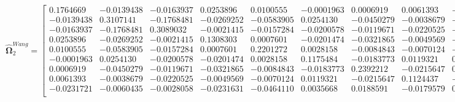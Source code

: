 \documentclass{article}\usepackage[]{graphicx}\usepackage[]{xcolor}
\def\bs{\boldsymbol}
\begin{document}
 \[
 \widehat{\bs{\Omega}}_{2}^{Wang} = 
 
  \begin{bmatrix}
 
 
 
 0.1764669 & -0.0139438 & -0.0163937 & 0.0253896 & 0.0100555 & -0.0001963 & 0.0006919 & 0.0061393 & -0.0231721\\
 
 -0.0139438 & 0.3107141 & -0.1768481 & -0.0269252 & -0.0583905 & 0.0254130 & -0.0450279 & -0.0038679 & -0.0060435\\
 
 -0.0163937 & -0.1768481 & 0.3089032 & -0.0021415 & -0.0157284 & -0.0200578 & -0.0119671 & -0.0220525 & -0.0028058\\
 
 0.0253896 & -0.0269252 & -0.0021415 & 0.1308303 & 0.0007601 & -0.0201474 & -0.0321865 & -0.0049569 & -0.0231631\\
 
 0.0100555 & -0.0583905 & -0.0157284 & 0.0007601 & 0.2201272 & 0.0028158 & -0.0084843 & -0.0070124 & -0.0464110\\
 
 -0.0001963 & 0.0254130 & -0.0200578 & -0.0201474 & 0.0028158 & 0.1175484 & -0.0183773 & 0.0119321 & 0.0035668\\
 
 0.0006919 & -0.0450279 & -0.0119671 & -0.0321865 & -0.0084843 & -0.0183773 & 0.2392212 & -0.0215647 & 0.0188591\\
 
 0.0061393 & -0.0038679 & -0.0220525 & -0.0049569 & -0.0070124 & 0.0119321 & -0.0215647 & 0.1124437 & -0.0179579\\
 
 -0.0231721 & -0.0060435 & -0.0028058 & -0.0231631 & -0.0464110 & 0.0035668 & 0.0188591 & -0.0179579 & 0.2017695\\
 \end{bmatrix}
 \]
 
\end{document}
